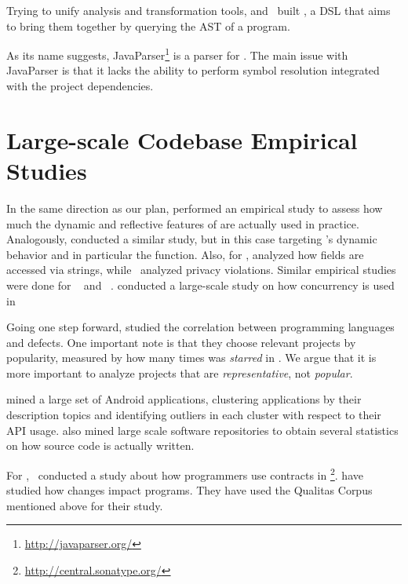 Trying to unify analysis and transformation tools,
\cite{vinjuHowMakeBridge2006} and~\cite{klintRASCALDomainSpecific2009} built \rascal,
a DSL that aims to bring them together by querying the AST of a program.

As its name suggests,
JavaParser\footnote{\url{http://javaparser.org/}}
is a parser for \java{}.
The main issue with JavaParser is that it lacks the ability to perform symbol resolution integrated with the project dependencies.


\section{Large-scale Codebase Empirical Studies}
\label{sec:literature-review:largescale}

In the same direction as our plan,
\cite{callauHowWhyDevelopers2013} performed an empirical study to assess
how much the dynamic and reflective features of \smalltalk{} are actually
used in practice.
Analogously, \cite{richardsAnalysisDynamicBehavior2010,richardsEvalThatMen2011,weiEmpiricalStudyDynamic2016}
conducted a similar study, but in this case targeting \javascript's dynamic
behavior and in particular the  function.
Also, for \javascript{}, \cite{madsenStringAnalysisDynamic2014} analyzed
how fields are accessed via strings,
while~\cite{jangEmpiricalStudyPrivacyviolating2010}
analyzed privacy violations.
Similar empirical studies were done for
\php{}~\citep{hillsEmpiricalStudyPHP2013,dahseExperienceReportEmpirical2015,doyleEmpiricalStudyEvolution2011}
and \swift{}~\citep{reboucasEmpiricalStudyUsage2016}.
\cite{PINTO201559} conducted a large-scale study on how concurrency is used in \java{}

Going one step forward, \cite{rayLargescaleStudyProgramming2017} studied the correlation between programming languages and defects. 
One important note is that they choose relevant projects by popularity,
measured by how many times was \emph{starred} in \github{}.
We argue that it is more important to analyze projects that are \emph{representative}, not \emph{popular}.

\cite{gorlaCheckingAppBehavior2014} mined a large set of Android applications, clustering applications by their description topics and identifying outliers in each cluster with respect to their API usage.
\cite{grechanikEmpiricalInvestigationLargescale2010} also mined large scale software repositories to obtain several statistics on how source code is actually written.

For \java{},~\cite{dietrichContractsWildStudy2017a} conducted a study
about how programmers use contracts in \mavencentral{}\footnote{\url{http://central.sonatype.org/}}.
\cite{dietrichBrokenPromisesEmpirical2014} have studied how
\api{} changes impact \java{} programs.
They have used the Qualitas Corpus~\citep{temperoQualitasCorpusCurated2010} mentioned above for their study.

